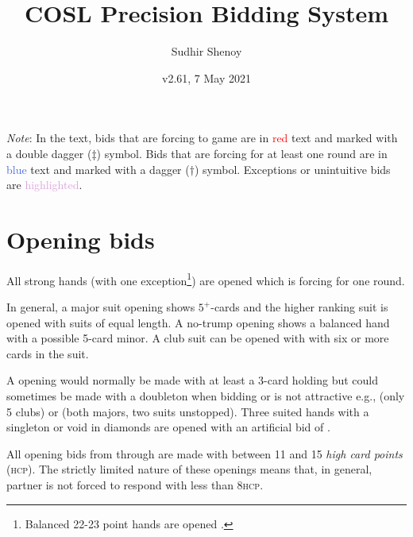 \documentclass[a4paper,article,oneside]{memoir}
\newcommand{\gap}{\vspace{\baselineskip}}
\newcommand{\hcp}{\textsc{hcp}}
\newcommand{\excp}[1]{\textcolor{Plum}{#1}} %
\begin{document}
\title{COSL Precision Bidding System}
\author{Sudhir Shenoy}
\date{v2.61, 7 May 2021}
\maketitle

\tableofcontents

\gap

\emph{Note}: In the text, bids that are forcing to game are in
\textcolor{Red}{red} text and marked with a double dagger ($\ddagger$)
symbol. Bids that are forcing for at least one round are in
\textcolor{RoyalBlue}{blue} text and marked with a dagger ($\dagger$)
symbol. Exceptions or unintuitive bids are \excp{highlighted}.

\pagebreak

\section{Opening bids}

All strong hands (with one exception\footnote{Balanced 22-23 point
  hands are opened .}) are opened  which is forcing for
one round.

In general, a major suit opening shows $5^+$-cards and the higher
ranking suit is opened with suits of equal length. A no-trump opening
shows a balanced hand with a possible 5-card minor. A club suit can be
opened with  with six or more cards in the suit.

A  opening would normally be made with at least a 3-card holding
but could sometimes be made with a doubleton when bidding  or
 is not attractive e.g.,  (only 5 clubs)
or  (both majors, two suits unstopped). Three
suited hands with a singleton or void in diamonds are opened with an
artificial bid of .

All opening bids from  through  are made with between 11
and 15 \emph{high card points} (\hcp). The strictly limited nature of
these openings means that, in general, partner is not forced to
respond with less than 8\hcp.
\end{document}
